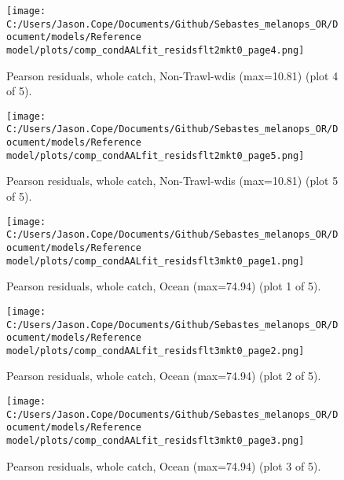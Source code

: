 \documentclass[11pt,
  letterpaper,
]{article}
\begin{document}
\begin{figure}
{\centering
\texttt{[image: C:/Users/Jason.Cope/Documents/Github/Sebastes\_melanops\_OR/Document/models/Reference model/plots/comp\_condAALfit\_residsflt2mkt0\_page4.png]}
}
\caption{Pearson residuals, whole catch, Non-Trawl-wdis (max=10.81) (plot 4 of 5).\label{fig:comp_condAALfit_residsflt2mkt0_page4}}
\end{figure}

\begin{figure}
{\centering
\texttt{[image: C:/Users/Jason.Cope/Documents/Github/Sebastes\_melanops\_OR/Document/models/Reference model/plots/comp\_condAALfit\_residsflt2mkt0\_page5.png]}
}
\caption{Pearson residuals, whole catch, Non-Trawl-wdis (max=10.81) (plot 5 of 5).\label{fig:comp_condAALfit_residsflt2mkt0_page5}}
\end{figure}

\begin{figure}
{\centering
\texttt{[image: C:/Users/Jason.Cope/Documents/Github/Sebastes\_melanops\_OR/Document/models/Reference model/plots/comp\_condAALfit\_residsflt3mkt0\_page1.png]}
}
\caption{Pearson residuals, whole catch, Ocean (max=74.94) (plot 1 of 5).\label{fig:comp_condAALfit_residsflt3mkt0_page1}}
\end{figure}

\begin{figure}
{\centering
\texttt{[image: C:/Users/Jason.Cope/Documents/Github/Sebastes\_melanops\_OR/Document/models/Reference model/plots/comp\_condAALfit\_residsflt3mkt0\_page2.png]}
}
\caption{Pearson residuals, whole catch, Ocean (max=74.94) (plot 2 of 5).\label{fig:comp_condAALfit_residsflt3mkt0_page2}}
\end{figure}

\begin{figure}
{\centering
\texttt{[image: C:/Users/Jason.Cope/Documents/Github/Sebastes\_melanops\_OR/Document/models/Reference model/plots/comp\_condAALfit\_residsflt3mkt0\_page3.png]}
}
\caption{Pearson residuals, whole catch, Ocean (max=74.94) (plot 3 of 5).\label{fig:comp_condAALfit_residsflt3mkt0_page3}}
\end{figure}
\end{document}
